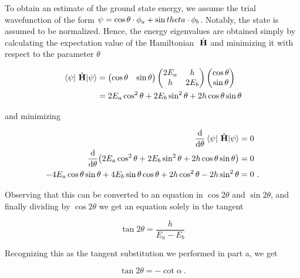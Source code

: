 \begin{alphaparts}
\questionpart
To obtain an estimate of the ground state energy, we assume the trial
wavefunction of the form $\psi = \cos{\theta} \cdot \phi_a +
\sin{theta} \cdot \phi_b$. Notably, the state is assumed to be normalized.
Hence, the energy eigenvalues are obtained simply by calculating the expectation
value of the Hamiltonian $~\hat{\textbf{H}}$ and minimizing it with respect to the
parameter $\theta$

\begin{align}
    \expectationvalue{\Hamiltonian}{\statepsi}  &=
    \begin{pmatrix}
        \cos{\theta} & \sin{\theta}
    \end{pmatrix}
    \begin{pmatrix}
        2E_a & h \\ 
        h   & 2E_b
    \end{pmatrix} \begin{pmatrix}
        \cos{\theta} \\ \sin{\theta}
    \end{pmatrix} \\
    &= 2E_a \cos^2{\theta} + 2E_b \sin^2{\theta} + 2h \cos{\theta}\sin{\theta}
\end{align}

and minimizing

\begin{align}
    \dv{\theta} \expectationvalue{\Hamiltonian}{\statepsi}  &= 0 \nonumber \\
    \dv{\theta} (2E_a \cos^2{\theta} + 2E_b \sin^2{\theta} + 2h \cos{\theta}\sin{\theta})  &= 0 \nonumber \\
    -4E_a \cos{\theta}\sin{\theta} + 4E_b \sin{\theta}\cos{\theta} 
    + 2h \cos^2{\theta} - 2h \sin^2{\theta}  &= 0~.
\end{align}

Observing that this can be converted to an equation in $\cos {2\theta}$ and
$\sin 2\theta$, and finally dividing by $\cos {2\theta}$ we get an equation
solely in the tangent

\begin{equation}
    \tan 2\theta = \frac{h}{E_a - E_b}
\end{equation}

Recognizing this as the tangent substitution we performed in part a, we get 

\begin{equation}
    \tan 2\theta = - \cot \alpha~.
\end{equation}


\end{alphaparts}
